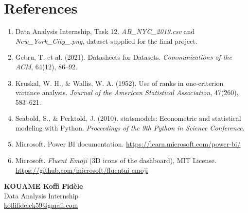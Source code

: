 \documentclass[12pt,a4paper]{article}
\begin{document}
\section*{References}
{\small\begin{enumerate}[itemsep=0pt]
\item Data Analysis Internship, Task 12. \emph{AB\_NYC\_2019.csv} and \emph{New\_York\_City\_.png}, dataset supplied for the final project.
\item Gebru, T. et al. (2021). Datasheets for Datasets. \emph{Communications of the ACM}, 64(12), 86--92.
\item Kruskal, W. H., \& Wallis, W. A. (1952). Use of ranks in one-criterion variance analysis. \emph{Journal of the American Statistical Association}, 47(260), 583--621.
\item Seabold, S., \& Perktold, J. (2010). statsmodels: Econometric and statistical modeling with Python. \emph{Proceedings of the 9th Python in Science Conference}.
\item Microsoft. Power BI documentation. \url{https://learn.microsoft.com/power-bi/}
\item Microsoft. \emph{Fluent Emoji} (3D icons of the dashboard), MIT License. \url{https://github.com/microsoft/fluentui-emoji}
\end{enumerate}}

\enlargethispage{4\baselineskip}
\vspace{0.1cm}
\noindent\hfill\begin{minipage}{7cm}\begin{flushright}\singlespacing
\textbf{KOUAME Koffi Fid\`ele}\\
Data Analysis Internship\\
\href{mailto:koffifidelek59@gmail.com}{koffifidelek59@gmail.com}
\end{flushright}\end{minipage}
\end{document}

